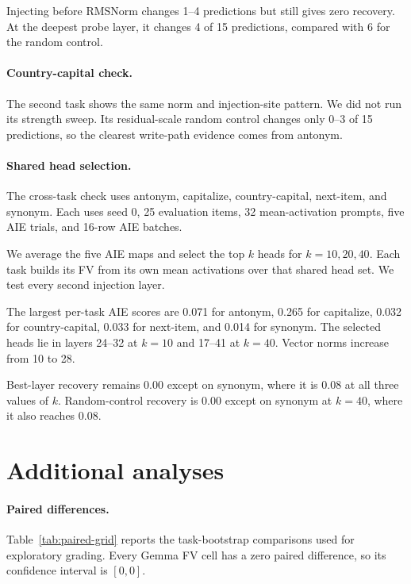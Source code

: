 \documentclass[11pt]{article}
\begin{document}
Injecting before RMSNorm changes 1--4 predictions but still gives zero recovery. At the deepest probe layer, it changes 4 of 15 predictions, compared with 6 for the random control.

\paragraph{Country-capital check.} The second task shows the same norm and injection-site pattern. We did not run its strength sweep. Its residual-scale random control changes only 0--3 of 15 predictions, so the clearest write-path evidence comes from antonym.

\paragraph{Shared head selection.} The cross-task check uses antonym, capitalize, country-capital, next-item, and synonym. Each uses seed 0, 25 evaluation items, 32 mean-activation prompts, five AIE trials, and 16-row AIE batches.

We average the five AIE maps and select the top $k$ heads for $k=10,20,40$. Each task builds its FV from its own mean activations over that shared head set. We test every second injection layer.

The largest per-task AIE scores are 0.071 for antonym, 0.265 for capitalize, 0.032 for country-capital, 0.033 for next-item, and 0.014 for synonym. The selected heads lie in layers 24--32 at $k=10$ and 17--41 at $k=40$. Vector norms increase from 10 to 28.

Best-layer recovery remains 0.00 except on synonym, where it is 0.08 at all three values of $k$. Random-control recovery is 0.00 except on synonym at $k=40$, where it also reaches 0.08.

\section{Additional analyses}
\label{sec:panel-analyses}

\begin{table}[t]
  \centering
  \small
  \setlength{\tabcolsep}{4pt}
  
  \caption{Exploratory TV and shuffled-state recovery at the TV's best layer, averaged over seeds. $^{\dagger}$: one seed; dash: untested.}
  \label{tab:per-task}
\end{table}

\paragraph{Paired differences.} Table~\ref{tab:paired-grid} reports the task-bootstrap comparisons used for exploratory grading. Every Gemma FV cell has a zero paired difference, so its confidence interval is $[0,0]$.
\end{document}
